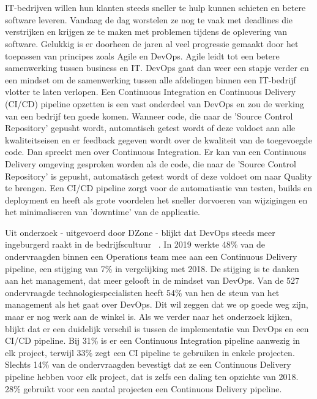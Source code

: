 
\chapter{}
\label{ch:inleiding}

IT-bedrijven willen hun klanten steeds sneller te hulp kunnen schieten en betere software leveren. Vandaag de dag worstelen ze nog te vaak met deadlines die verstrijken en krijgen ze te maken met problemen tijdens de oplevering van software. Gelukkig is er doorheen de jaren al veel progressie gemaakt door het toepassen van principes zoals Agile en DevOps. Agile leidt tot een betere samenwerking tussen business en IT. DevOps gaat dan weer een stapje verder en een mindset om de samenwerking tussen alle afdelingen binnen een IT-bedrijf vlotter te laten verlopen. 
Een Continuous Integration en Continuous Delivery (CI/CD) pipeline opzetten is een vast onderdeel van DevOps en zou de werking van een bedrijf ten goede komen. Wanneer code, die naar de 'Source Control Repository' gepusht wordt, automatisch getest wordt of deze voldoet aan alle kwaliteitseisen en er feedback gegeven wordt over de kwaliteit van de toegevoegde code. Dan spreekt men over Continuous Integration. Er kan van een Continuous Delivery omgeving gesproken worden als de code, die naar de 'Source Control Repository' is gepusht, automatisch getest wordt of deze voldoet om naar Quality te brengen. Een CI/CD pipeline zorgt voor de automatisatie van testen, builds en deployment en heeft als grote voordelen het sneller dorvoeren van wijzigingen en het minimaliseren van 'downtime' van de applicatie.

Uit onderzoek - uitgevoerd door DZone - blijkt dat DevOps steeds meer ingeburgerd raakt in de bedrijfscultuur ~\autocite{Baker2019}. In 2019 werkte 48\% van de ondervraagden binnen een Operations team mee aan een Continuous Delivery pipeline, een stijging van 7\% in vergelijking met 2018.
De stijging is te danken aan het management, dat meer gelooft in de mindset van DevOps. Van de 527 ondervraagde technologiespecialisten heeft 54\% van hen de steun van het management als het gaat over DevOps. Dit wil zeggen dat we op goede weg zijn, maar er nog werk aan de winkel is.
Als we verder naar het onderzoek kijken, blijkt dat er een duidelijk verschil is tussen de implementatie van DevOps en een CI/CD pipeline. 
Bij 31\% is er een Continuous Integration pipeline aanwezig in elk project, terwijl 33\% zegt een CI pipeline te gebruiken in enkele projecten.
Slechts 14\% van de ondervraagden bevestigt dat ze een Continuous Delivery pipeline hebben voor elk project, dat is zelfs een daling ten opzichte van 2018.
28\% gebruikt voor een aantal projecten een Continuous Delivery pipeline.

